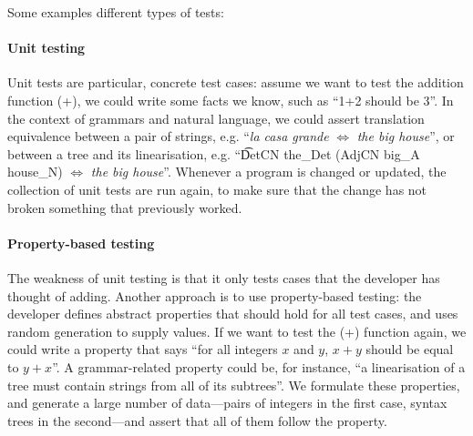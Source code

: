 Some examples different types of tests:

\paragraph{Unit testing}

Unit tests are particular, concrete test cases: assume we want to test the
addition function (+), we could write some facts we know, such as
``1+2 should be 3''. In the context of grammars and natural language,
we could assert translation equivalence between a pair of strings,
e.g. ``\emph{la casa grande} $\Leftrightarrow$ \emph{the big house}'',
or between a tree and its linearisation, e.g. ``\t{DetCN the\_Det
  (AdjCN  big\_A house\_N)} $\Leftrightarrow$ \emph{the big house}''.
Whenever a program is changed or updated, the collection of unit tests
are run again, to make sure that the change has not broken something
that previously worked.

\paragraph{Property-based testing}

The weakness of unit testing is that it only tests cases that the
developer has thought of adding. Another approach is to use
property-based testing: the developer defines abstract properties that
should hold for all test cases, and uses random generation to supply
values. If we want to test the (+) function again, we could write a
property that says ``for all integers $x$ and $y$, $x+y$ should be
equal to $y+x$''.  A grammar-related property could be, for instance,
``a linearisation of a tree must contain strings from all of its
subtrees''.  We formulate these properties, and generate a large
number of data---pairs of integers in the first case, syntax trees in
the second---and assert that all of them follow the property.


